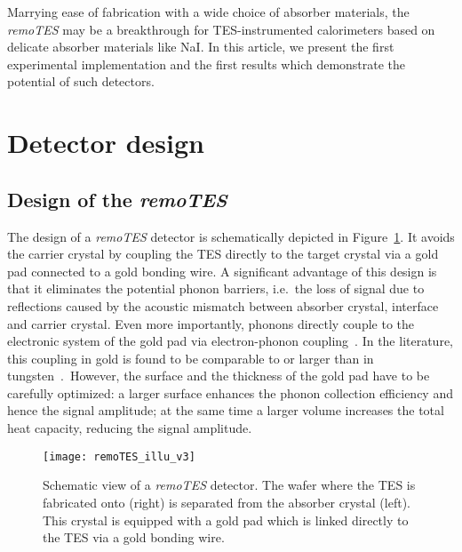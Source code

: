 \documentclass[superscriptaddress,nofootinbib ]{revtex4-2}
\begin{document}
Marrying ease of fabrication with a wide choice of absorber materials, the \textit{remoTES} may be a breakthrough for TES-instrumented calorimeters based on delicate absorber materials like NaI. In this article, we present the first experimental implementation and the first results which demonstrate the potential of such detectors.





\section{Detector design}
\subsection{Design of the \textit{remoTES}}
The design of a \textit{remoTES} detector is schematically depicted in Figure~\ref{fig:remoTES}. It avoids the carrier crystal by coupling the TES directly to the target crystal via a gold pad connected to a gold bonding wire. A significant advantage of this design is that it eliminates the potential phonon barriers, i.e.~the loss of signal due to reflections caused by the acoustic mismatch between absorber crystal, interface and carrier crystal. Even more importantly, phonons directly couple to the electronic system of the gold pad via electron-phonon coupling~\cite{little1959transport}. In the literature, this coupling in gold is found to be comparable to or larger than in tungsten~\cite{probst_model_1995, sisti2001massive, karvonen2004electron,hart2009phase, pyle2015optimized}.~However, the surface and the thickness of the gold pad have to be carefully optimized: a larger surface enhances the phonon collection efficiency and hence the signal amplitude; at the same time a larger volume increases the total heat capacity, reducing the signal amplitude.



\begin{figure}[!htb]
\centering
   \texttt{[image: remoTES\_illu\_v3]}
  \caption{Schematic view of a \textit{remoTES} detector. The wafer where the TES is fabricated onto (right) is separated from the absorber crystal (left). This crystal is equipped with a gold pad which is linked directly to the TES via a gold bonding wire.}
  \label{fig:remoTES}
\end{figure}
\end{document}

